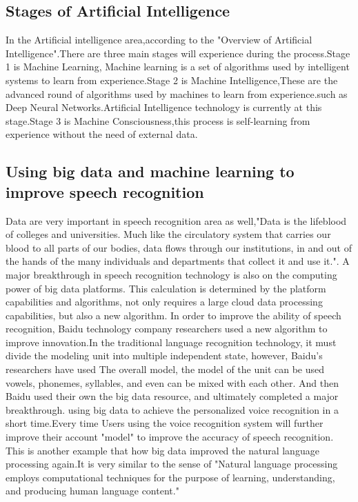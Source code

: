 \documentclass[sigconf]{acmart}
\begin{document}
\subsection{Stages of Artificial Intelligence}
In the Artificial intelligence area,according to the "Overview of Artificial Intelligence"\cite{Jagreet2017}.There are three main stages will experience during the process.Stage 1 is Machine Learning, Machine learning is a set of algorithms used by intelligent systems to learn from experience.Stage 2 is Machine Intelligence,These are the advanced round of algorithms used by machines to learn from experience.such as Deep Neural Networks.Artificial Intelligence technology is currently at this stage.Stage 3 is Machine Consciousness,this process is self-learning from experience without the need of external data.


\subsection{Using big data and machine learning to improve speech recognition}
Data are very important in speech recognition area as well,"Data is the lifeblood of colleges and universities. Much like the circulatory system that carries our blood to all parts of our bodies, data flows through our institutions, in and out of the hands of the many individuals and departments that collect it and use it."\cite{Wiley2016}. A major breakthrough in speech recognition technology is also on the computing power of big data platforms. This calculation is determined by the platform capabilities and algorithms, not only requires a large cloud data processing capabilities, but also a new algorithm. In order to improve the ability of speech recognition, Baidu technology company researchers used a new algorithm to improve innovation.In the traditional language recognition technology, it must divide the modeling unit into multiple independent state, however, Baidu's researchers have used The overall model, the model of the unit can be used vowels, phonemes, syllables, and even can be mixed with each other. And then Baidu used their own the big data resource, and ultimately completed a major breakthrough. using big data to achieve the personalized voice recognition in a short time.Every time Users using the voice recognition system will further improve their account "model" to improve the accuracy of speech recognition. This is another example that how big data improved the natural language processing again.It is very similar to the sense of "Natural language processing employs computational techniques for the purpose of learning, understanding, and producing human language content."\cite{Hirschberg12015}
\end{document}
